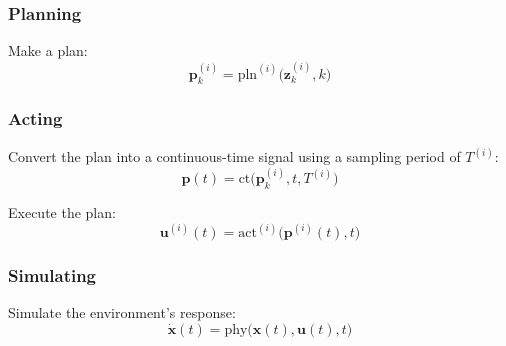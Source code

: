 \subsubsection{Planning}
\begin{definition}
    Make a plan:
    \[
    \mathbf{p}_k^{(i)} = \text{pln}^{(i)}\big(\mathbf{z}_k^{(i)}, k\big)
    \]
\end{definition}

\subsubsection{Acting}
\begin{definition}
    Convert the plan into a continuous-time signal using a sampling period of \( T^{(i)} \):
    \[
    \mathbf{p}(t) = \text{ct}\big(\mathbf{p}_k^{(i)}, t, T^{(i)}\big)
    \]

    Execute the plan:
    \[
    \mathbf{u}^{(i)}(t) = \text{act}^{(i)}\big(\mathbf{p}^{(i)}(t), t\big)
    \]
\end{definition}
\newpage

\subsubsection{Simulating}
\begin{definition}
    Simulate the environment's response:
    \[
    \dot{\mathbf{x}}(t) = \text{phy}\big(\mathbf{x}(t), \mathbf{u}(t), t\big)
    \]
\end{definition}